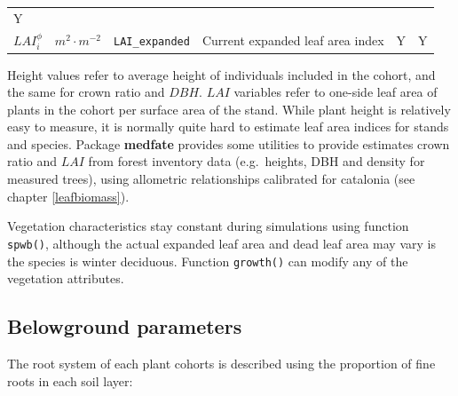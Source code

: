 \documentclass[]{book}
\begin{document}
\begin{longtable}[]{@{}llllll@{}}
\begin{minipage}[t]{0.07\columnwidth}
Y\strut
\end{minipage}\tabularnewline
\begin{minipage}[t]{0.10\columnwidth}\raggedright
\(LAI^{\phi}_i\)\strut
\end{minipage} & \begin{minipage}[t]{0.09\columnwidth}\raggedright
\(m^2 \cdot m^{-2}\)\strut
\end{minipage} & \begin{minipage}[t]{0.06\columnwidth}\raggedright
\texttt{LAI\_expanded}\strut
\end{minipage} & \begin{minipage}[t]{0.43\columnwidth}\raggedright
Current expanded leaf area index\strut
\end{minipage} & \begin{minipage}[t]{0.07\columnwidth}\raggedright
Y\strut
\end{minipage} & \begin{minipage}[t]{0.07\columnwidth}\raggedright
Y\strut
\end{minipage}\tabularnewline
\bottomrule
\end{longtable}

Height values refer to average height of individuals included in the cohort, and the same for crown ratio and \(DBH\). \(LAI\) variables refer to one-side leaf area of plants in the cohort per surface area of the stand. While plant height is relatively easy to measure, it is normally quite hard to estimate leaf area indices for stands and species. Package \textbf{medfate} provides some utilities to provide estimates crown ratio and \(LAI\) from forest inventory data (e.g.~heights, DBH and density for measured trees), using allometric relationships calibrated for catalonia (see chapter \ref{leafbiomass}).

Vegetation characteristics stay constant during simulations using function \texttt{spwb()}, although the actual expanded leaf area and dead leaf area may vary is the species is winter deciduous. Function \texttt{growth()} can modify any of the vegetation attributes.

\hypertarget{belowground-parameters}{%
\subsection{Belowground parameters}\label{belowground-parameters}}

The root system of each plant cohorts is described using the proportion of fine
roots in each soil layer:
\end{document}
